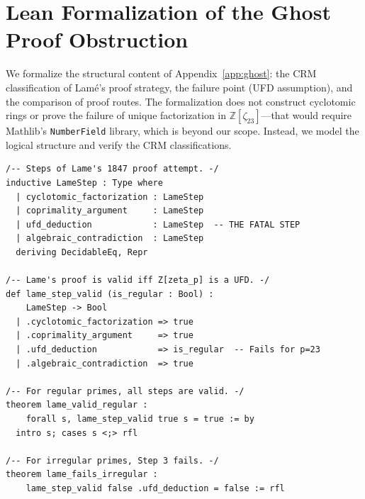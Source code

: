 \documentclass[11pt,a4paper]{article}
\theoremstyle{plain}
\theoremstyle{definition}
\newcommand{\Z}{\mathbb{Z}}
\begin{document}
\section{Lean Formalization of the Ghost Proof Obstruction}\label{app:lean-ghost}

We formalize the structural content of Appendix~\ref{app:ghost}: the CRM classification of Lam\'e's proof strategy, the failure point (UFD assumption), and the comparison of proof routes.
The formalization does not construct cyclotomic rings or prove the failure of unique factorization in $\Z[\zeta_{23}]$---that would require Mathlib's \texttt{NumberField} library, which is beyond our scope.
Instead, we model the logical structure and verify the CRM classifications.

\begin{tcolorbox}[leanbox={GhostProof.lean — Lam\'e's ghost proof structure}]
\begin{lstlisting}[style=leanstyle]
/-- Steps of Lame's 1847 proof attempt. -/
inductive LameStep : Type where
  | cyclotomic_factorization : LameStep
  | coprimality_argument     : LameStep
  | ufd_deduction            : LameStep  -- THE FATAL STEP
  | algebraic_contradiction  : LameStep
  deriving DecidableEq, Repr

/-- Lame's proof is valid iff Z[zeta_p] is a UFD. -/
def lame_step_valid (is_regular : Bool) :
    LameStep -> Bool
  | .cyclotomic_factorization => true
  | .coprimality_argument     => true
  | .ufd_deduction            => is_regular  -- Fails for p=23
  | .algebraic_contradiction  => true

/-- For regular primes, all steps are valid. -/
theorem lame_valid_regular :
    forall s, lame_step_valid true s = true := by
  intro s; cases s <;> rfl

/-- For irregular primes, Step 3 fails. -/
theorem lame_fails_irregular :
    lame_step_valid false .ufd_deduction = false := rfl
\end{lstlisting}
\end{tcolorbox}
\end{document}
